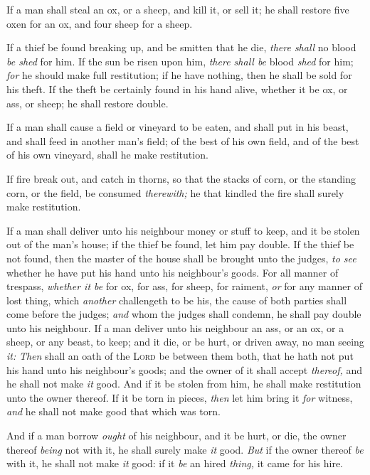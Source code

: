 \documentclass[11pt,letterpaper,oneside]{memoir}
\begin{document}
If a man shall steal an ox, or a sheep, and kill it, or sell it; he
shall restore five oxen for an ox, and four sheep for a sheep.

If a thief be found breaking up, and be smitten that he die, \emph{there
shall} no blood \emph{be shed} for him. If the sun be risen upon him,
\emph{there shall be} blood \emph{shed} for him; \emph{for} he should
make full restitution; if he have nothing, then he shall be sold for his
theft. If the theft be certainly found in his hand alive, whether it be
ox, or ass, or sheep; he shall restore double.

If a man shall cause a field or vineyard to be eaten, and shall put in
his beast, and shall feed in another man's field; of the best of his own
field, and of the best of his own vineyard, shall he make restitution.

If fire break out, and catch in thorns, so that the stacks of corn, or
the standing corn, or the field, be consumed \emph{therewith;} he that
kindled the fire shall surely make restitution.

If a man shall deliver unto his neighbour money or stuff to keep, and it
be stolen out of the man's house; if the thief be found, let him pay
double. If the thief be not found, then the master of the house shall be
brought unto the judges, \emph{to see} whether he have put his hand unto
his neighbour's goods. For all manner of trespass, \emph{whether it be}
for ox, for ass, for sheep, for raiment, \emph{or} for any manner of
lost thing, which \emph{another} challengeth to be his, the cause of
both parties shall come before the judges; \emph{and} whom the judges
shall condemn, he shall pay double unto his neighbour. If a man deliver
unto his neighbour an ass, or an ox, or a sheep, or any beast, to keep;
and it die, or be hurt, or driven away, no man seeing \emph{it:
}\emph{Then} shall an oath of the \textsc{Lord} be between them both,
that he hath not put his hand unto his neighbour's goods; and the owner
of it shall accept \emph{thereof,} and he shall not make \emph{it} good.
And if it be stolen from him, he shall make restitution unto the owner
thereof. If it be torn in pieces, \emph{then} let him bring it
\emph{for} witness, \emph{and} he shall not make good that which was
torn.

And if a man borrow \emph{ought} of his neighbour, and it be hurt, or
die, the owner thereof \emph{being} not with it, he shall surely make
\emph{it} good. \emph{But} if the owner thereof \emph{be} with it, he
shall not make \emph{it} good: if it \emph{be} an hired \emph{thing,} it
came for his hire.
\end{document}
